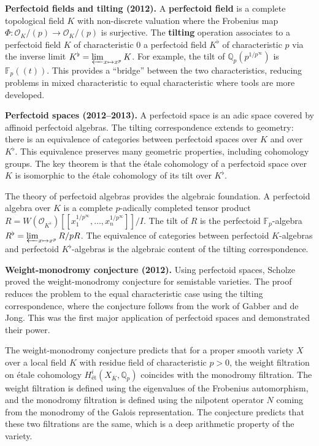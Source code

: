 \textbf{Perfectoid fields and tilting (2012).} A \textbf{perfectoid field} is a complete topological field $K$ with non-discrete valuation where the Frobenius map $\Phi: \mathcal{O}_K/(p) \to \mathcal{O}_K/(p)$ is surjective. The \textbf{tilting} operation associates to a perfectoid field $K$ of characteristic 0 a perfectoid field $K^\flat$ of characteristic $p$ via the inverse limit $K^\flat = \varprojlim_{x \mapsto x^p} K$. For example, the tilt of $\mathbb{Q}_p(p^{1/p^\infty})$ is $\mathbb{F}_p((t))$. This provides a ``bridge'' between the two characteristics, reducing problems in mixed characteristic to equal characteristic where tools are more developed.

\textbf{Perfectoid spaces (2012--2013).} A perfectoid space is an adic space covered by affinoid perfectoid algebras. The tilting correspondence extends to geometry: there is an equivalence of categories between perfectoid spaces over $K$ and over $K^\flat$. This equivalence preserves many geometric properties, including cohomology groups. The key theorem is that the \'{e}tale cohomology of a perfectoid space over $K$ is isomorphic to the \'{e}tale cohomology of its tilt over $K^\flat$.

The theory of perfectoid algebras provides the algebraic foundation. A perfectoid algebra over $K$ is a complete $p$-adically completed tensor product $R = W(\mathcal{O}_{K^\flat})[\![x_1^{1/p^\infty}, \ldots, x_n^{1/p^\infty}]\!]/I$. The tilt of $R$ is the perfectoid $\mathbb{F}_p$-algebra $R^\flat = \varprojlim_{x \mapsto x^p} R/pR$. The equivalence of categories between perfectoid $K$-algebras and perfectoid $K^\flat$-algebras is the algebraic content of the tilting correspondence.

\textbf{Weight-monodromy conjecture (2012).} Using perfectoid spaces, Scholze proved the weight-monodromy conjecture for semistable varieties. The proof reduces the problem to the equal characteristic case using the tilting correspondence, where the conjecture follows from the work of Gabber and de Jong. This was the first major application of perfectoid spaces and demonstrated their power.

The weight-monodromy conjecture predicts that for a proper smooth variety $X$ over a local field $K$ with residue field of characteristic $p > 0$, the weight filtration on \'{e}tale cohomology $H^i_{\text{\'{e}t}}(X_{\overline{K}}, \mathbb{Q}_p)$ coincides with the monodromy filtration. The weight filtration is defined using the eigenvalues of the Frobenius automorphism, and the monodromy filtration is defined using the nilpotent operator $N$ coming from the monodromy of the Galois representation. The conjecture predicts that these two filtrations are the same, which is a deep arithmetic property of the variety.

